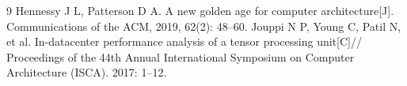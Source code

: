 \begin{thebibliography}{9}
   Hennessy J L, Patterson D A. A new golden age for computer architecture[J]. Communications of the ACM, 2019, 62(2): 48--60.
   Jouppi N P, Young C, Patil N, et al. In-datacenter performance analysis of a tensor processing unit[C]// Proceedings of the 44th Annual International Symposium on Computer Architecture (ISCA). 2017: 1--12.
\end{thebibliography}
